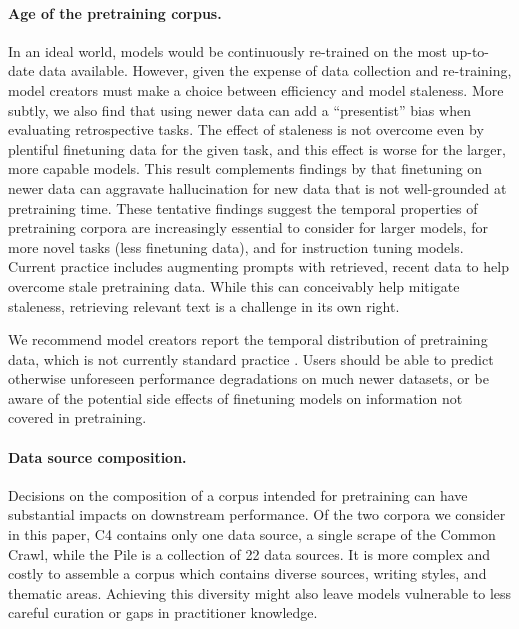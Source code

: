 \documentclass{article}
\newcommand{\kl}[1]{\textcolor{blue}{[katherine: #1]}}
\begin{document}
\paragraph{Age of the pretraining corpus.}
In an ideal world, models would be continuously re-trained on the most up-to-date data available.
However, given the expense of data collection and re-training, model creators must make a choice between efficiency and model staleness.
More subtly, we also find that using newer data can add a ``presentist'' bias when evaluating retrospective tasks.
The effect of staleness is not overcome even by plentiful finetuning data for the given task, and this effect is worse for the larger, more capable models.
This result complements findings by \citet{schulman2023} that finetuning on newer data can aggravate hallucination for new data that is not well-grounded at pretraining time.
These tentative findings suggest the temporal properties of pretraining corpora are increasingly essential to consider for larger models, for more novel tasks (less finetuning data), and for instruction tuning models.
Current practice includes augmenting prompts with retrieved, recent data to help overcome stale pretraining data. While this can conceivably help mitigate staleness, retrieving relevant text is a challenge in its own right.

We recommend model creators report the temporal distribution of pretraining data, which is not currently standard practice \citep{hoffmann2022training, thoppilan2022lamda, anthropic2023claude, cohere2023}.
Users should be able to predict otherwise unforeseen performance degradations on much newer datasets, or be aware of the potential side effects of finetuning models on information not covered in pretraining.

\vspace{-3mm}
\paragraph{Data source composition.}
Decisions on the composition of a corpus intended for pretraining can have substantial impacts on downstream performance.
Of the two corpora we consider in this paper, C4 contains only one data source, a single scrape of the Common Crawl, while the Pile is a collection of 22 data sources.
It is more complex and costly to assemble a corpus which contains diverse sources, writing styles, and thematic areas.
Achieving this diversity might also leave models vulnerable to less careful curation or gaps in practitioner knowledge.
\end{document}
